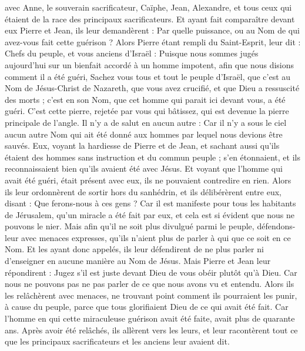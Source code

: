 \begin{multicols}{2}
{avec Anne, le souverain sacrificateur, Caïphe, Jean, Alexandre, et tous ceux qui étaient de la race des principaux sacrificateurs.
Et ayant fait comparaître devant eux Pierre et Jean, ils leur demandèrent : Par quelle puissance, ou au Nom de qui avez-vous fait cette guérison ?
Alors Pierre étant rempli du Saint-Esprit, leur dit : Chefs du peuple, et vous anciens d'Israël :
Puisque nous sommes jugés aujourd'hui sur un bienfait accordé à un homme impotent, afin que nous disions comment il a été guéri,
Sachez vous tous et tout le peuple d'Israël, que c'est au Nom de Jésus-Christ de Nazareth, que vous avez crucifié, et que Dieu a ressuscité des morts ; c'est en son Nom, que cet homme qui parait ici devant vous, a été guéri.
C'est cette pierre, rejetée par vous qui bâtissez, qui est devenue la pierre principale de l'angle.
Il n'y a de salut en aucun autre : Car il n'y a sous le ciel aucun autre Nom qui ait été donné aux hommes par lequel nous devions être sauvés.
Eux, voyant la hardiesse de Pierre et de Jean, et sachant aussi qu'ils étaient des hommes sans instruction et du commun peuple ; s'en étonnaient, et ils reconnaissaient bien qu'ils avaient été avec Jésus.
Et voyant que l'homme qui avait été guéri, était présent avec eux, ils ne pouvaient contredire en rien.
Alors ils leur ordonnèrent de sortir hors du sanhédrin, et ils délibérèrent entre eux, disant : Que ferons-nous à ces gens ?
Car il est manifeste pour tous les habitants de Jérusalem, qu'un miracle a été fait par eux, et cela est si évident que nous ne pouvons le nier.
Mais afin qu'il ne soit plus divulgué parmi le peuple, défendons-leur avec menaces expresses, qu'ils n'aient plus de parler à qui que ce soit en ce Nom.
Et les ayant donc appelés, ils leur défendirent de ne plus parler ni d'enseigner en aucune manière au Nom de Jésus.
Mais Pierre et Jean leur répondirent : Jugez s'il est juste devant Dieu de vous obéir plutôt qu'à Dieu.
Car nous ne pouvons pas ne pas parler de ce que nous avons vu et entendu.
Alors ils les relâchèrent avec menaces, ne trouvant point comment ils pourraient les punir, à cause du peuple, parce que tous glorifiaient Dieu de ce qui avait été fait.
Car l'homme en qui cette miraculeuse guérison avait été faite, avait plus de quarante ans.
Après avoir été relâchés, ils allèrent vers les leurs, et leur racontèrent tout ce que les principaux sacrificateurs et les anciens leur avaient dit.
}
\end{multicols}
